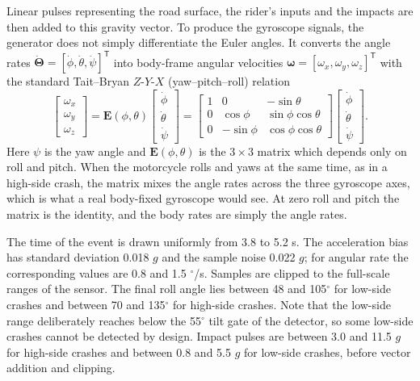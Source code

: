 \documentclass[10pt,a4paper]{article}
\newcommand{\degree}{\ensuremath{^{\circ}}}
\begin{document}
Linear pulses representing the road surface, the rider's inputs and the impacts are then added to this gravity vector. To produce the gyroscope signals, the generator does not simply differentiate the Euler angles. It converts the angle rates $\dot{\boldsymbol\Theta}=[\dot\phi,\dot\theta,\dot\psi]^{\mathsf T}$ into body-frame angular velocities $\boldsymbol\omega=[\omega_x,\omega_y,\omega_z]^{\mathsf T}$ with the standard Tait--Bryan $Z$-$Y$-$X$ (yaw--pitch--roll) relation
\begin{equation}\label{eq:rigid_body}
\begin{bmatrix}\omega_x\\\omega_y\\\omega_z\end{bmatrix}=
\mathbf E(\phi,\theta)\begin{bmatrix}\dot\phi\\\dot\theta\\\dot\psi\end{bmatrix}=
\begin{bmatrix}
1 & 0 & -\sin\theta\\
0 & \cos\phi & \sin\phi\cos\theta\\
0 & -\sin\phi & \cos\phi\cos\theta
\end{bmatrix}
\begin{bmatrix}\dot\phi\\\dot\theta\\\dot\psi\end{bmatrix}.
\end{equation}
Here $\psi$ is the yaw angle and $\mathbf E(\phi,\theta)$ is the $3\times3$ matrix which depends only on roll and pitch. When the motorcycle rolls and yaws at the same time, as in a high-side crash, the matrix mixes the angle rates across the three gyroscope axes, which is what a real body-fixed gyroscope would see. At zero roll and pitch the matrix is the identity, and the body rates are simply the angle rates.

The time of the event is drawn uniformly from 3.8 to 5.2 s. The acceleration bias has standard deviation 0.018 $g$ and the sample noise 0.022 $g$; for angular rate the corresponding values are 0.8 and 1.5 $\degree$/s. Samples are clipped to the full-scale ranges of the sensor. The final roll angle lies between 48 and 105$\degree$ for low-side crashes and between 70 and 135$\degree$ for high-side crashes. Note that the low-side range deliberately reaches below the 55$\degree$ tilt gate of the detector, so some low-side crashes cannot be detected by design. Impact pulses are between 3.0 and 11.5 $g$ for high-side crashes and between 0.8 and 5.5 $g$ for low-side crashes, before vector addition and clipping.
\end{document}
